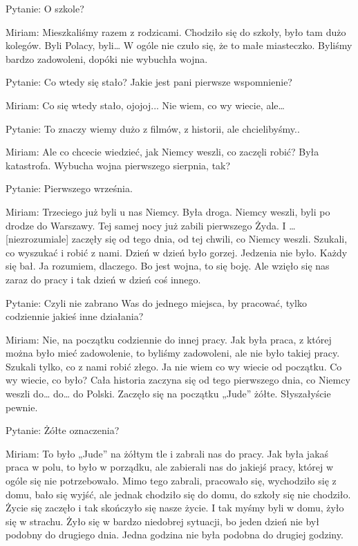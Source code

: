 Pytanie: O szkole? 

Miriam: Mieszkaliśmy razem z rodzicami. Chodziło się do szkoły, było tam dużo kolegów. Byli Polacy, byli… W ogóle nie czuło się, że to małe miasteczko. Byliśmy bardzo zadowoleni, dopóki nie wybuchła wojna. 

Pytanie: Co wtedy się stało? Jakie jest pani pierwsze wspomnienie? 

Miriam: Co się wtedy stało, ojojoj... Nie wiem, co wy wiecie, ale… 

Pytanie: To znaczy wiemy dużo z filmów, z historii, ale chcielibyśmy.. 

Miriam: Ale co chcecie wiedzieć, jak Niemcy weszli, co zaczęli robić? Była katastrofa. Wybucha wojna pierwszego sierpnia, tak? 

Pytanie: Pierwszego września. 

Miriam: Trzeciego już byli u nas Niemcy. Była droga. Niemcy weszli, byli po drodze do Warszawy. Tej samej nocy już zabili pierwszego Żyda. I … [niezrozumiale] zaczęły się od tego dnia, od tej chwili, co Niemcy weszli. Szukali, co wyszukać i robić z nami. Dzień w dzień było gorzej. Jedzenia nie było. Każdy się bał. Ja rozumiem, dlaczego. Bo jest wojna, to się boję. Ale wzięło się nas zaraz do pracy i tak dzień w dzień coś innego. 

 

Pytanie: Czyli nie zabrano Was do jednego miejsca, by pracować, tylko codziennie jakieś inne działania? 

Miriam: Nie, na początku codziennie do innej pracy. Jak była praca, z której można było mieć zadowolenie, to byliśmy zadowoleni, ale nie było takiej pracy. Szukali tylko, co z nami robić złego. Ja nie wiem co wy wiecie od początku. Co wy wiecie, co było? Cała historia zaczyna się od tego pierwszego dnia, co Niemcy weszli do… do… do Polski. Zaczęło się na początku „Jude” żółte. Słyszałyście pewnie. 

 

Pytanie: Żółte oznaczenia? 

Miriam: To było „Jude” na żółtym tle i zabrali nas do pracy. Jak była jakaś praca w polu, to było w porządku, ale zabierali nas do jakiejś pracy, której w ogóle się nie potrzebowało. Mimo tego zabrali, pracowało się, wychodziło się z domu, bało się wyjść, ale jednak chodziło się do domu, do szkoły się nie chodziło. Życie się zaczęło i tak skończyło się nasze życie. I tak myśmy byli w domu, żyło się w strachu. Żyło się w bardzo niedobrej sytuacji, bo jeden dzień nie był podobny do drugiego dnia. Jedna godzina nie była podobna do drugiej godziny. 


